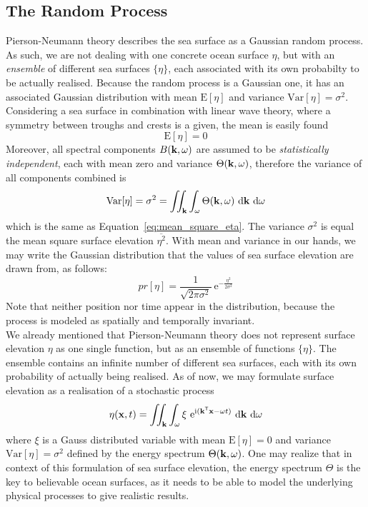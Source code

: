 \subsection{The Random Process}
\label{sec:random_process}
Pierson-Neumann theory describes the sea surface as a Gaussian random process.
As such, we are not dealing with one concrete ocean surface $\eta$, but with an
\emph{ensemble} of different sea surfaces $\{\eta\}$, each associated with its
own probabilty to be actually realised. Because the random process is a
Gaussian one, it has an associated Gaussian distribution with mean
$\mathrm{E}[\eta]$ and variance $\mathrm{Var}[\eta] = \sigma^2$. Considering a
sea surface in combination with linear wave theory, where a symmetry between
troughs and crests is a given, the mean is easily found
\begin{equation}
 \mathrm{E}[\eta] = 0
\end{equation}
%
Moreover, all spectral components $B(\mathbf{k},\omega)$ are assumed to be
\emph{statistically independent}, each with mean zero and variance $\Theta(\mathbf{k},\omega)$,
therefore the variance of all components combined is
\begin{equation}
\label{eq:random_process_variance}
\mathrm{Var}[\eta] = \sigma^2 = \iint_{\mathbf{k}}
\int_{\omega}\Theta(\mathbf{k},\omega)~\mathrm{d}\mathbf{k}~\mathrm{ d}\omega
\end{equation}
which is the same as Equation~\ref{eq:mean_square_eta}. The variance
$\sigma^2$ is equal the mean square surface elevation $\overline{\eta^2}$. With
mean and variance in our hands, we may write the Gaussian distribution that the
values of sea surface elevation are drawn from, as follows:
\begin{equation}
\label{eq:gaussian_dist}
 pr[\eta] = \frac{1}{\sqrt{2\pi\sigma^2}}~\mathrm{e}^{-\frac{\eta^2}{2\sigma^2}}
\end{equation}
Note that neither position nor time appear in the distribution, because the
process is modeled as spatially and temporally invariant.\\

We already mentioned that Pierson-Neumann theory does not represent surface
elevation $\eta$ as one single function, but as an ensemble of functions
$\{\eta\}$. The ensemble contains an infinite number of different sea surfaces,
each with its own probability of actually being realised. As of now, we may
formulate surface elevation as a realisation of a stochastic process
\begin{equation}
\label{eq:surface_elevation_gauss}
 \eta(\mathbf{x}, t) = \iint_{\mathbf{k}}\int_{\omega} \xi
~\mathrm{e}^{\mathrm{i}(\mathbf{k}^{\mathsf{T}}\mathbf{x}-
\omega t)}~
\mathrm{d}\mathbf{k}~\mathrm{d}\omega
\end{equation}
where $\xi$ is a Gauss distributed variable with mean $\mathrm{E}[\eta] = 0$ and
variance $\mathrm{Var}[\eta] = \sigma^2$ defined by the energy spectrum
$\Theta(\mathbf{k}, \omega)$. One may realize that in context of this formulation
of sea surface elevation, the energy spectrum $\Theta$ is the key to believable
ocean surfaces, as it needs to be able to model the underlying physical
processes to give realistic results.\\

